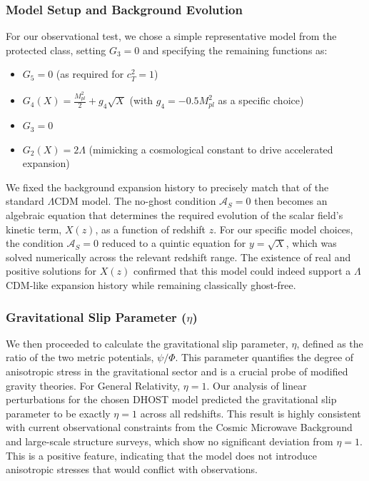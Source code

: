 \documentclass[twocolumn]{aastex631}
\begin{document}
\subsubsection{Model Setup and Background Evolution}
For our observational test, we chose a simple representative model from the protected class, setting $G_3=0$ and specifying the remaining functions as:
\begin{itemize}
    \item $G_5 = 0$ (as required for $c_T^2=1$)
    \item $G_4(X) = \frac{M_{pl}^2}{2} + g_4 \sqrt{X}$ (with $g_4 = -0.5 M_{pl}^2$ as a specific choice)
    \item $G_3 = 0$
    \item $G_2(X) = 2\Lambda$ (mimicking a cosmological constant to drive accelerated expansion)
\end{itemize}
We fixed the background expansion history to precisely match that of the standard $\Lambda$CDM model. The no-ghost condition $\mathcal{A}_S=0$ then becomes an algebraic equation that determines the required evolution of the scalar field's kinetic term, $X(z)$, as a function of redshift $z$. For our specific model choices, the condition $\mathcal{A}_S=0$ reduced to a quintic equation for $y = \sqrt{X}$, which was solved numerically across the relevant redshift range. The existence of real and positive solutions for $X(z)$ confirmed that this model could indeed support a $\Lambda$CDM-like expansion history while remaining classically ghost-free.

\subsubsection{Gravitational Slip Parameter ($\eta$)}
We then proceeded to calculate the gravitational slip parameter, $\eta$, defined as the ratio of the two metric potentials, $\psi/\Phi$. This parameter quantifies the degree of anisotropic stress in the gravitational sector and is a crucial probe of modified gravity theories. For General Relativity, $\eta=1$. Our analysis of linear perturbations for the chosen DHOST model predicted the gravitational slip parameter to be exactly $\eta=1$ across all redshifts. This result is highly consistent with current observational constraints from the Cosmic Microwave Background and large-scale structure surveys, which show no significant deviation from $\eta=1$. This is a positive feature, indicating that the model does not introduce anisotropic stresses that would conflict with observations.
\end{document}
